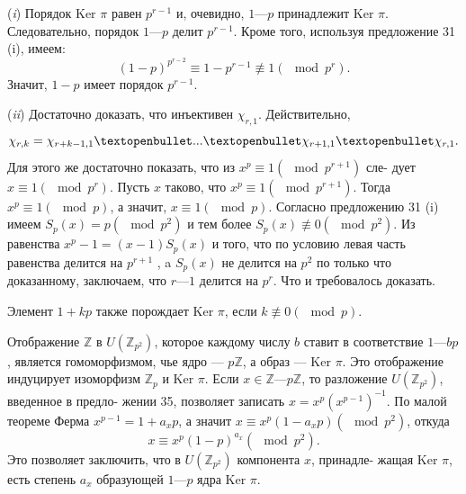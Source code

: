 \begin{myproof}
 
\par  (\textit{i}) Порядок $\text{Ker }\pi$ равен $p^{r-1}$ и, очевидно, $1 — p$ принадлежит $\text{Ker }\pi$.\linebreak
Следовательно, порядок $1 — p$ делит $p^{r - 1}$. Кроме того, используя\linebreak
предложение 31 (i), имеем:
$$(1-p)^{p^{r-2}}\equiv 1 - p^{r-1} \not\equiv 1 (\mod p^r).$$
Значит, $1 - p$ имеет порядок $p^{r-1}$.
\par  (\textit{ii}) Достаточно доказать, что инъективен $\chi_{r,1}$. Действительно,\linebreak
$$\chi_{r,k} = \chi_{r+k-1,1}\textopenbullet...\textopenbullet\chi_{r+1,1}\textopenbullet\chi_{r,1}.$$
Для этого же достаточно показать, что из $x^p \equiv 1 (\mod p^{r+1})$ сле­-\linebreak
дует $x \equiv 1 (\mod p^r)$. Пусть $x$ таково, что $x^p \equiv 1(\mod p^{r + 1})$. Тогда\linebreak
$x^p \equiv 1 (\mod p)$, а значит, $x \equiv 1 (\mod p)$. Согласно предложению 31\linebreak
(i) имеем $S_p(x) = p (\mod p^2 )$ и тем более $S_p (x) \not\equiv 0 (\mod p^2 )$. Из\linebreak
равенства $x^p -1 = (x - 1)S_p(x)$ и того, что по условию левая часть\linebreak
равенства делится на $p^{r + 1}$ , a $S_p(x)$ не делится на $p^2$ по только что
доказанному, заключаем, что $r —1$ делится на $p^r$. Что и требовалось
доказать.
\end{myproof}
\begin{mynotice}
Элемент $1 + kp$ также порождает $\text{Ker }\pi$, если $k \not\equiv 0$\linebreak $(\mod p)$.

Отображение $\mathbb{Z}$ в $U(
\mathbb{Z}_{p^2})$, которое каждому числу $b$ ставит в\linebreak
соответствие $1 — bp$, является гомоморфизмом, чье ядро — $p\mathbb{Z}$, а\linebreak
образ — $\text{Ker }\pi$. Это отображение индуцирует изоморфизм $\mathbb{Z}_p$ и\linebreak
$\text{Ker }\pi$. Если $x \in \mathbb{Z} — p\mathbb{Z}$, то разложение $U(\mathbb{Z}_{p^2})$, введенное в предло­-\linebreak
жении 35, позволяет записать $x = x^p(x^{p-1})^{-1}$. По малой теореме\linebreak
Ферма 
$x^{p-1}=1+a_xp$, а значит $x \equiv x^p(1-a_xp) (\mod p^2)$, откуда\linebreak
$$x \equiv x^p(1-p)^{a_x}(\mod p^2).$$
Это позволяет заключить, что в $U(\mathbb{Z}_{p^2})$ компонента $x$, принадле-\linebreak­
жащая $\text{Ker }\pi$, есть степень $a_x$ образующей $1 — p$ ядра $\text{Ker }\pi$.
\end{mynotice}


